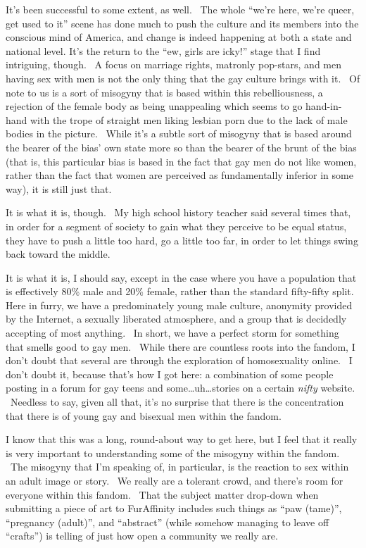 It's been successful to some extent, as well. ~The whole ``we're here,
we're queer, get used to it'' scene has done much to push the culture
and its members into the conscious mind of America, and change is indeed
happening at both a state and national level. It's the return to the
``ew, girls are icky!'' stage that I find intriguing, though. ~A focus
on marriage rights, matronly pop-stars, and men having sex with men is
not the only thing that the gay culture brings with it. ~Of note to us
is a sort of misogyny that is based within this rebelliousness, a
rejection of the female body as being unappealing which seems to go
hand-in-hand with the trope of straight men liking lesbian porn due to
the lack of male bodies in the picture. ~While it's a subtle sort of
misogyny that is based around the bearer of the bias' own state more so
than the bearer of the brunt of the bias (that is, this particular bias
is based in the fact that gay men do not like women, rather than the
fact that women are perceived as fundamentally inferior in some way), it
is still just that.

It is what it is, though. ~My high school history teacher said several
times that, in order for a segment of society to gain what they perceive
to be equal status, they have to push a little too hard, go a little too
far, in order to let things swing back toward the middle.

It is what it is, I should say, except in the case where you have a
population that is effectively 80\% male and 20\% female, rather than
the standard fifty-fifty split. Here in furry, we have a predominately
young male culture, anonymity provided by the Internet, a sexually
liberated atmosphere, and a group that is decidedly accepting of most
anything. ~In short, we have a perfect storm for something that smells
good to gay men. ~While there are countless roots into the fandom, I
don't doubt that several are through the exploration of homosexuality
online. ~I don't doubt it, because that's how I got here: a combination
of some people posting in a forum for gay teens and
some\ldots{}uh\ldots{}stories on a certain \emph{nifty} website.
~Needless to say, given all that, it's no surprise that there is the
concentration that there is of young gay and bisexual men within the
fandom.

I know that this was a long, round-about way to get here, but I feel
that it really is very important to understanding some of the misogyny
within the fandom. ~The misogyny that I'm speaking of, in particular, is
the reaction to sex within an adult image or story. ~We really are a
tolerant crowd, and there's room for everyone within this fandom. ~That
the subject matter drop-down when submitting a piece of art to
FurAffinity includes such things as ``paw (tame)'', ``pregnancy
(adult)'', and ``abstract'' (while somehow managing to leave off
``crafts'') is telling of just how open a community we really are.

